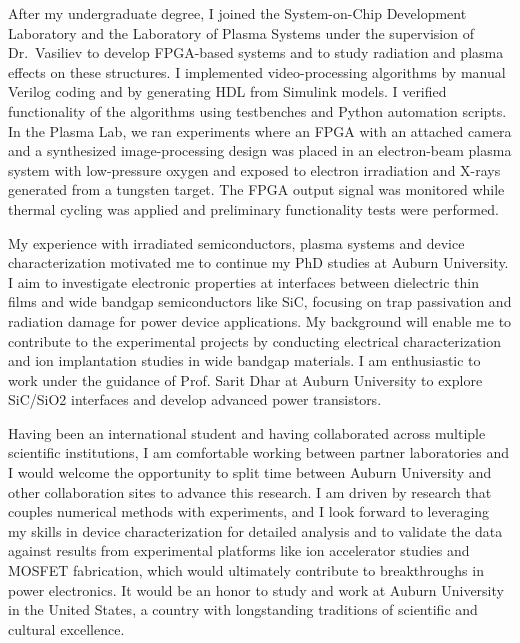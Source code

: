 \documentclass[a4paper,12pt]{article}
\begin{document}
After my undergraduate degree, I joined the System-on-Chip Development Laboratory and the Laboratory of Plasma Systems under the supervision of Dr.\ Vasiliev to develop FPGA-based systems and to study radiation and plasma effects on these structures. I implemented video-processing algorithms by manual Verilog coding and by generating HDL from Simulink models. I verified functionality of the algorithms using testbenches and Python automation scripts. In the Plasma Lab, we ran experiments where an FPGA with an attached camera and a synthesized image-processing design was placed in an electron-beam plasma system with low-pressure oxygen and exposed to electron irradiation and X-rays generated from a tungsten target. The FPGA output signal was monitored while thermal cycling was applied and preliminary functionality tests were performed.
\vspace{10pt}

My experience with irradiated semiconductors, plasma systems and device characterization motivated me to continue my PhD studies at Auburn University. I aim to investigate electronic properties at interfaces between dielectric thin films and wide bandgap semiconductors like SiC, focusing on trap passivation and radiation damage for power device applications. My background will enable me to contribute to the experimental projects by conducting electrical characterization and ion implantation studies in wide bandgap materials. I am enthusiastic to work under the guidance of Prof. Sarit Dhar at Auburn University to explore SiC/SiO2 interfaces and develop advanced power transistors.

\vspace{10pt}
Having been an international student and having collaborated across multiple scientific institutions, I am comfortable working between partner laboratories and I would welcome the opportunity to split time between Auburn University and other collaboration sites to advance this research. I am driven by research that couples numerical methods with experiments, and I look forward to leveraging my skills in device characterization for detailed analysis and to validate the data against results from experimental platforms like ion accelerator studies and MOSFET fabrication, which would ultimately contribute to breakthroughs in power electronics. It would be an honor to study and work at Auburn University in the United States, a country with longstanding traditions of scientific and cultural excellence.
\end{document}
